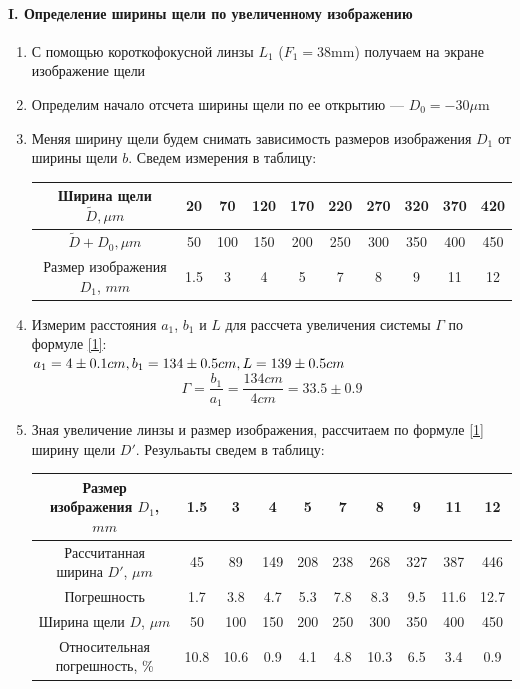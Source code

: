 \documentclass[12pt]{article}
\begin{document}
\paragraph{I. Определение ширины щели по увеличенному изображению}
\begin{enumerate}
    \item С помощью короткофокусной линзы $ L_1 $ ($ F_1 = 38\text{mm} $) получаем на экране изображение щели
    
    \item Определим начало отсчета ширины щели по ее открытию --- $D_0 = -30 \mu \text{m} $    
    
    \item Меняя ширину щели будем снимать зависимость размеров изображения $ D_1 $ от ширины щели $b$. Сведем измерения в таблицу:\\
    \begin{tabu} to 1.2\textwidth{|c|c|c|c|c|c|c|c|c|c|}
    \hline
    Ширина щели $\tilde D, \mu m$ & 20 & 70 & 120 & 170 & 220 & 270 & 320 & 370 & 420 \\
    \hline
    $\tilde D + D_0, \mu m$ & 50 & 100 & 150 & 200 & 250 & 300 & 350 & 400 & 450 \\
    \hline
    Размер изображения $D_1$, $mm$ & 1.5 & 3 & 4 & 5 & 7 & 8 & 9 & 11 & 12 \\
    \hline
    \end{tabu}
    
    \item Измерим расстояния $a_1$, $b_1$ и $L$ для рассчета увеличения системы $\Gamma$ по формуле \ref{1}:\\
    $a_1 = 4 \pm 0.1 cm,\\  b_1 = 134 \pm 0.5 cm,\\ L = 139 \pm 0.5 cm $
    \begin{equation}
        \Gamma = \frac{b_1}{a_1} = \frac{134 cm}{4 cm} = 33.5 \pm 0.9 
    \end{equation}  
    
    \item Зная увеличение линзы и размер изображения, рассчитаем по формуле \ref{1} ширину щели $D'$. Резульаьты сведем в таблицу: \\
    \begin{tabu} to 1\textwidth{|c|c|c|c|c|c|c|c|c|c|}
    \hline
    Размер изображения $D_1$, $mm$ & 1.5 & 3 & 4 & 5 & 7 & 8 & 9 & 11 & 12 \\
    \hline
    Рассчитанная ширина $D'$, $\mu m$ & 45 & 89 & 149 & 208 & 238 & 268 & 327 & 387 & 446 \\
    \hline
    Погрешность & 1.7 & 3.8 & 4.7 & 5.3 & 7.8 & 8.3 & 9.5 & 11.6 & 12.7\\
    \hline
    Ширина щели $D$, $\mu m$ & 50 & 100 & 150 & 200 & 250 & 300 & 350 & 400 & 450 \\
    \hline
    Относительная погрешность, \% & 10.8 & 10.6 & 0.9 & 4.1 & 4.8 & 10.3 & 6.5 & 3.4 & 0.9\\
    \hline
    \end{tabu}

\end{enumerate}
\end{document}
